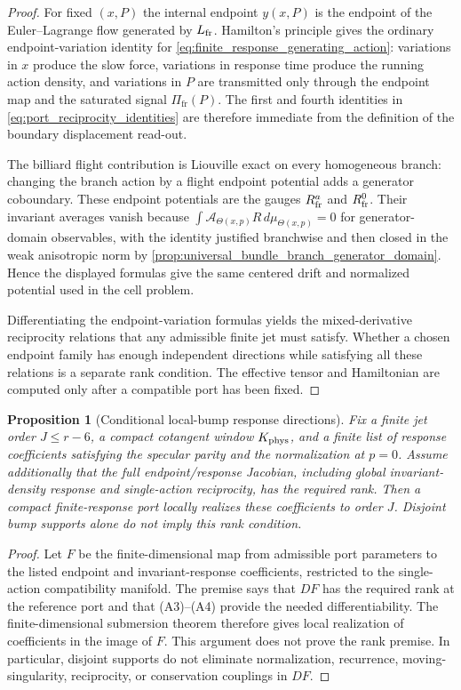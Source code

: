 \documentclass[12pt, letterpaper]{amsart}
\newcommand{\Acal}{\mathcal{A}}
\newcommand{\Pifr}{\Pi_{\mathrm{fr}}}
\theoremstyle{plain}
\newtheorem{proposition}[theorem]{Proposition}
\theoremstyle{definition}
\theoremstyle{remark}
\begin{document}
\begin{proof}
For fixed $(x,P)$ the internal endpoint $y(x,P)$ is the endpoint of the
Euler--Lagrange flow generated by $L_{\rm fr}$.  Hamilton's principle gives the
ordinary endpoint-variation identity for \eqref{eq:finite_response_generating_action}:
variations in $x$ produce the slow force, variations in response time produce
the running action density, and variations in $P$ are transmitted only through
the endpoint map and the saturated signal $\Pifr(P)$.  The first and fourth
identities in \eqref{eq:port_reciprocity_identities} are therefore immediate
from the definition of the boundary displacement read-out.

The billiard flight contribution is Liouville exact on every homogeneous branch:
changing the branch action by a flight endpoint potential adds a generator
coboundary.  These endpoint potentials are the gauges $R^a_{\rm fr}$ and
$R^0_{\rm fr}$.  Their invariant averages vanish because
$\int\Acal_{\Theta(x,p)}R\,d\mu_{\Theta(x,p)}=0$ for generator-domain observables,
with the identity justified branchwise and then closed in the weak anisotropic
norm by \cref{prop:universal_bundle_branch_generator_domain}.  Hence the displayed
formulas give the same centered drift and normalized potential used in the cell
problem.

Differentiating the endpoint-variation formulas yields the mixed-derivative
reciprocity relations that any admissible finite jet must satisfy.  Whether a
chosen endpoint family has enough independent directions while satisfying all
these relations is a separate rank condition.  The effective tensor and
Hamiltonian are computed only after a compatible port has been fixed.
\end{proof}

\begin{proposition}[Conditional local-bump response directions]
\label{prop:triangular_bump_realization}
Fix a finite jet order $J\le r-6$, a compact cotangent window
$K_{\rm phys}$, and a finite list of response coefficients satisfying the
specular parity and the normalization at $p=0$.  Assume additionally that the
full endpoint/response Jacobian, including global invariant-density response and
single-action reciprocity, has the required rank.  Then a compact
finite-response port locally realizes these coefficients to order $J$.
Disjoint bump supports alone do not imply this rank condition.
\end{proposition}

\begin{proof}
Let $F$ be the finite-dimensional map from admissible port parameters to the
listed endpoint and invariant-response coefficients, restricted to the
single-action compatibility manifold.  The premise says that $DF$ has the
required rank at the reference port and that \textup{(A3)--(A4)} provide the
needed differentiability.  The finite-dimensional submersion theorem therefore
gives local realization of coefficients in the image of $F$.  This argument does
not prove the rank premise.  In particular, disjoint supports do not eliminate
normalization, recurrence, moving-singularity, reciprocity, or conservation
couplings in $DF$.
\end{proof}
\end{document}
